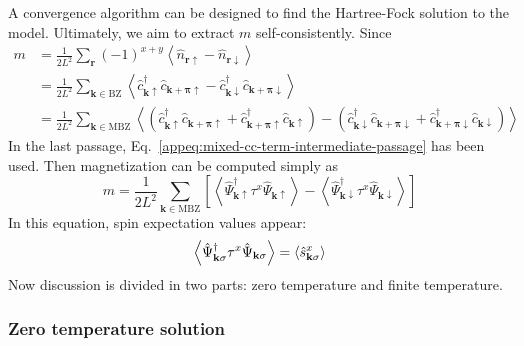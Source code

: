 A convergence algorithm can be designed to find the Hartree-Fock solution to the model. Ultimately, we aim to extract $m$ self-consistently. Since
\[
\begin{aligned}
	m &= \frac{1}{2L^2} \sum_\mathbf{r} (-1)^{x+y} \left\langle
		\hat n_{\mathbf{r}\uparrow} - \hat n_{\mathbf{r}\downarrow}
	\right\rangle \\
	&= \frac{1}{2L^2} \sum_{\mathbf{k} \in \mathrm{BZ}} \left\langle
		\hat c_{\mathbf{k}\uparrow}^\dagger \hat c_{\mathbf{k}+\bm{\pi}\uparrow} - \hat c_{\mathbf{k}\downarrow}^\dagger \hat c_{\mathbf{k}+\bm{\pi}\downarrow}
	\right\rangle \\
	&= \frac{1}{2L^2} \sum_{\mathbf{k} \in \mathrm{MBZ}} \left\langle
			\left(
				\hat c_{\mathbf{k}\uparrow}^\dagger \hat c_{\mathbf{k}+\bm{\pi}\uparrow} + \hat c_{\mathbf{k}+\bm{\pi}\uparrow}^\dagger \hat c_{\mathbf{k}\uparrow}	
			\right) - \left(
				\hat c_{\mathbf{k}\downarrow}^\dagger \hat c_{\mathbf{k}+\bm{\pi}\downarrow} + \hat c_{\mathbf{k}+\bm{\pi}\downarrow}^\dagger \hat c_{\mathbf{k}\downarrow}	
			\right)
		\right\rangle
\end{aligned}
\]
In the last passage, Eq.~\eqref{appeq:mixed-cc-term-intermediate-passage} has been used. Then magnetization can be computed simply as
\begin{equation}\label{appeq:antiferromagnet-magnetization-self-consistence-abstract}
	m = \frac{1}{2L^2} \sum_{\mathbf{k} \in \mathrm{MBZ}} \left[
		\left\langle 
			\hat \Psi_{\mathbf{k}\uparrow}^\dagger \tau^x \hat \Psi_{\mathbf{k}\uparrow}
		\right\rangle - \left\langle 
			\hat \Psi_{\mathbf{k}\downarrow}^\dagger \tau^x \hat \Psi_{\mathbf{k}\downarrow}
		\right\rangle
	\right]
\end{equation}
In this equation, spin expectation values appear:
\[
	\left\langle 
		\hat \Psi_{\mathbf{k}\sigma}^\dagger \tau^x \hat \Psi_{\mathbf{k}\sigma}
	\right\rangle = \ev{\hat s_{\mathbf{k}\sigma}^x}
\]
Now discussion is divided in two parts: zero temperature and finite temperature.

\subsubsection{Zero temperature solution}

